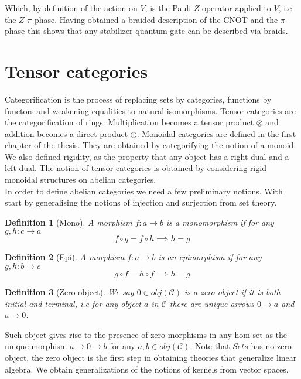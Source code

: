 \documentclass{article}
\newtheorem{definition}{Definition}
\newcommand{\cat}{\mathcal{C}}
\begin{document}
Which, by definition of the action on $V$, is the Pauli $Z$ operator applied to $V$, i.e the $Z$ $\pi$ phase. Having obtained a braided description of the CNOT and the $\pi$-phase this shows that any stabilizer quantum gate can be described via braids. 





\appendix
	\section{Tensor categories}
	Categorification is the process of replacing sets by categories, functions by functors and weakening equalities to natural isomorphisms. Tensor categories are the categorification of rings. Multiplication becomes a tensor product $\otimes$ and addition becomes a direct product $\oplus$. Monoidal categories are defined in the first chapter of the thesis. They are obtained by categorifying the notion of a monoid. We also defined rigidity, as the property that any object has a right dual and a left dual. The notion of tensor categories is obtained by considering rigid monoidal structures on abelian categories.\\
	In order to define abelian categories we need a few preliminary notions.
	With start by generalising the notions of injection and surjection from set theory.
	\begin{definition}[Mono]
		A morphism $f: a \rightarrow b$ is a monomorphism if for any $g,h: c \rightarrow a$
		$$f \circ g = f \circ h \implies h=g$$
	\end{definition}
	\begin{definition}[Epi]
		A morphism $f: a \rightarrow b$ is an epimorphism if for any $g,h: b \rightarrow c$
		$$g \circ f = h \circ f \implies h=g$$
	\end{definition}
	\begin{definition}[Zero object]
		We say $0 \in obj(\cat)$ is a zero object if it is both initial and terminal, i.e for any object $a$ in $\cat$ there are unique arrows $0 \rightarrow a$ and $a \rightarrow 0$.
	\end{definition}
	Such object gives rise to the presence of zero morphisms in any hom-set as the unique morphism $a \rightarrow 0 \rightarrow b$ for any $a,b \in obj(\cat)$. Note that $Sets$ has no zero object, the zero object is the first step in obtaining theories that generalize linear algebra. We obtain generalizations of the notions of kernels from vector spaces.
\end{document}

